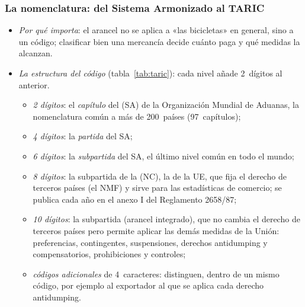 \documentclass[11pt]{article}
\begin{document}
\subsubsection{La nomenclatura: del Sistema Armonizado al TARIC}\label{sec:taric}

\begin{itemize}
\item \emph{Por qué importa}: el arancel no se aplica a «las bicicletas» en general, sino a un código; clasificar bien una mercancía decide cuánto paga y qué medidas la alcanzan.
\item \emph{La estructura del código} (tabla~\ref{tab:taric}): cada nivel añade 2~dígitos al anterior.
  \begin{itemize}
  \item \emph{2 dígitos}: el \emph{capítulo} del  (SA) de la Organización Mundial de Aduanas, la nomenclatura común a más de 200~países (97~capítulos);
  \item \emph{4 dígitos}: la \emph{partida} del SA;
  \item \emph{6 dígitos}: la \emph{subpartida} del SA, el último nivel común en todo el mundo;
  \item \emph{8 dígitos}: la subpartida de la  (NC), la de la UE, que fija el derecho de terceros países (el NMF) y sirve para las estadísticas de comercio; se publica cada año en el anexo I del Reglamento 2658/87;
  \item \emph{10 dígitos}: la subpartida  (arancel integrado), que no cambia el derecho de terceros países pero permite aplicar las demás medidas de la Unión: preferencias, contingentes, suspensiones, derechos antidumping y compensatorios, prohibiciones y controles\nocite{CE2026TARIC};
  \item \emph{códigos adicionales} de 4~caracteres: distinguen, dentro de un mismo código, por ejemplo al exportador al que se aplica cada derecho antidumping.
  \end{itemize}
\end{itemize}
\end{document}
